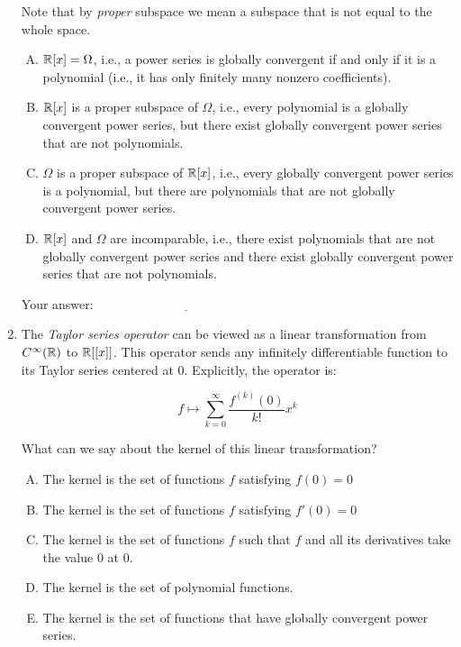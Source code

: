 \documentclass[10pt]{amsart}
\begin{document}
\begin{enumerate}
  Note that by {\em proper} subspace we mean a subspace that is not
  equal to the whole space.
  \begin{enumerate}[(A)]
  \item $\mathbb{R}[x] = \Omega$, i.e., a power series is globally convergent
    if and only if it is a polynomial (i.e., it has only finitely many
    nonzero coefficients).
  \item $\mathbb{R}[x]$ is a proper subspace of $\Omega$, i.e., every
    polynomial is a globally convergent power series, but there exist
    globally convergent power series that are not polynomials.
  \item $\Omega$ is a proper subspace of $\mathbb{R}[x]$, i.e., every globally
    convergent power series is a polynomial, but there are polynomials
    that are not globally convergent power series.
  \item $\mathbb{R}[x]$ and $\Omega$ are incomparable, i.e., there exist
    polynomials that are not globally convergent power series and
    there exist globally convergent power series that are not
    polynomials.
  \end{enumerate}

  \vspace{0.1in}
  Your answer: $\underline{\qquad\qquad\qquad\qquad\qquad\qquad\qquad}$
  \vspace{0.1in}

\item The {\em Taylor series operator} can be viewed as a linear
  transformation from $C^\infty(\mathbb{R})$ to $\mathbb{R}[[x]]$. This operator sends
  any infinitely differentiable function to its Taylor series centered
  at $0$. Explicitly, the operator is:

  $$f \mapsto \sum_{k=0}^\infty \frac{f^{(k)}(0)}{k!}x^k$$

  What can we say about the kernel of this linear transformation?

  \begin{enumerate}[(A)]
  \item The kernel is the set of functions $f$ satisfying $f(0) = 0$
  \item The kernel is the set of functions $f$ satisfying $f'(0) = 0$
  \item The kernel is the set of functions $f$ such that $f$ and all
    its derivatives take the value $0$ at $0$.
  \item The kernel is the set of polynomial functions.
  \item The kernel is the set of functions that have globally
    convergent power series.
  \end{enumerate}


\end{enumerate}
\end{document}
